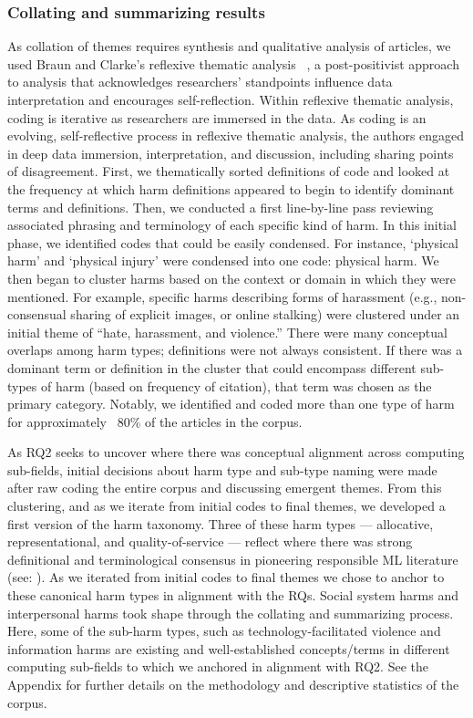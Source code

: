 \subsubsection{Collating and summarizing results}
As collation of themes requires synthesis and qualitative analysis of articles, we used Braun and Clarke’s reflexive thematic analysis ~\cite{Braun_Clarke_2006, Braun_Clarke_2021}, a post-positivist approach to analysis that acknowledges researchers’ standpoints influence data interpretation and encourages self-reflection. Within reflexive thematic analysis, coding is iterative as researchers are immersed in the data. As coding is an evolving, self-reflective process in reflexive thematic analysis, the authors engaged in deep data immersion, interpretation, and discussion, including sharing points of disagreement. First, we thematically sorted definitions of code and looked at the frequency at which harm definitions appeared to begin to identify dominant terms and definitions. Then, we conducted a first line-by-line pass reviewing associated phrasing and terminology of each specific kind of harm. In this initial phase, we identified codes that could be easily condensed. For instance, ‘physical harm’ and ‘physical injury’ were condensed into one code: physical harm. We then began to cluster harms based on the context or domain in which they were mentioned. For example, specific harms describing forms of harassment (e.g., non-consensual sharing of explicit images, or online stalking) were clustered under an initial theme of “hate, harassment, and violence.” There were many conceptual overlaps among harm types; definitions were not always consistent. If there was a dominant term or definition in the cluster that could encompass different sub-types of harm (based on frequency of citation), that term was chosen as the primary category. Notably, we identified and coded more than one type of harm for approximately ~80\% of the articles in the corpus. 

As RQ2 seeks to uncover where there was conceptual alignment across computing sub-fields, initial decisions about harm type and sub-type naming were made after raw coding the entire corpus and discussing emergent themes. From this clustering, and as we iterate from initial codes to final themes, we developed a first version of the harm taxonomy. Three of these harm types — allocative, representational, and quality-of-service — reflect where there was strong definitional and terminological consensus in pioneering responsible ML literature (see: \cite{barocas2017problem, Wang_Barocas_Laird_Wallach_2022, Crawford_2017}). As we iterated from initial codes to final themes we chose to anchor to these canonical harm types in alignment with the RQs. Social system harms and interpersonal harms took shape through the collating and summarizing process. Here, some of the sub-harm types, such as technology-facilitated violence \cite{henry2018technology} and information harms \cite{Wardle_and_Derakhshan_2017} are existing and well-established concepts/terms in different computing sub-fields to which we anchored in alignment with RQ2. See the Appendix for further details on the methodology and descriptive statistics of the corpus.

